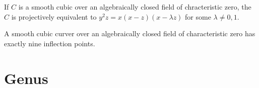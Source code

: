 \documentclass{article}
\begin{document}
\begin{corollary}
    
\end{corollary}

\begin{theorem}
    If $C$ is a smooth cubic over an algebraically closed field of chracteristic zero, the $C$ is projectively equivalent to $y^2z = x(x-z)(x-\lambda z)$ for some $\lambda\neq 0,1$.
\end{theorem}

\begin{theorem}
    A smooth cubic curver over an algebraically closed field of characteristic zero has exactly nine inflection points.
\end{theorem}

\section{Genus}
\end{document}

